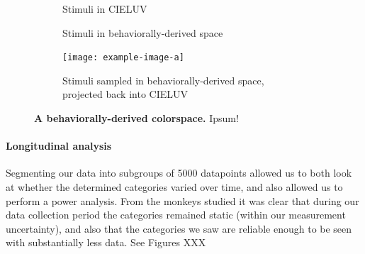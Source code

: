 \begin{figure}
    \centering
    \begin{subfigure}[b]{0.3\textwidth}
         \centering
         \caption{Stimuli in CIELUV \newline\newline}
         
         \label{fig:CIELUV}
    \end{subfigure}
    \hfill
    \begin{subfigure}[b]{0.3\textwidth}
         \centering
         \caption{Stimuli in behaviorally-derived space \newline}
         
         \label{fig:MACBEHspace}
    \end{subfigure}
    \hfill
    \begin{subfigure}[b]{0.3\textwidth}
         \centering
         \caption{Stimuli sampled in behaviorally-derived space, projected back into CIELUV}
         \texttt{[image: example-image-a]}
         \label{fig:UniformStimsInCIELUV}
    \end{subfigure}
           \caption{\textbf{A behaviorally-derived colorspace.} Ipsum!}
        \label{fig:MACBEHcolorspace}
    
\end{figure}

\paragraph{Longitudinal analysis}

Segmenting our data into subgroups of 5000 datapoints allowed us to both look at whether the determined categories varied over time, and also allowed us to perform a power analysis. From the monkeys studied it was clear that during our data collection period the categories remained static (within our measurement uncertainty), and also that the categories we saw are reliable enough to be seen with substantially less data. See Figures XXX %